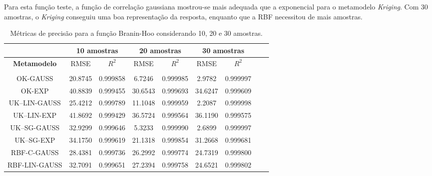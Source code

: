 Para esta função teste, a função de correlação gaussiana mostrou-se mais adequada que a exponencial para o metamodelo {\it Kriging}. Com 30 amostras, o {\it Kriging} conseguiu uma boa representação da resposta, enquanto que a RBF necessitou de mais amostras.

\begin{table}[H]
	\centering
	\caption{Métricas de precisão para a função Branin-Hoo considerando 10, 20 e 30 amostras.} \label{1b} 
	\begin{tabular}{c c c c c c c c c}
		\toprule
		& \multicolumn{2}{c}{\bf 10 amostras} & \multicolumn{2}{c}{\bf 20 amostras} & \multicolumn{2}{c}{\bf 30 amostras} \\ \midrule
		{\bf Metamodelo} & RMSE & {\bf $R^{2}$} & RMSE & {\bf $R^{2}$} & RMSE & {\bf $R^{2}$} \\
		\hline \\
		{OK-GAUSS} & 20.8745 & 0.999858 & 6.7246 & 0.999985 & 2.9782 & 0.999997 \\[4pt]
		OK-EXP & 40.8839 & 0.999455 & 30.6543 & 0.999693 & 34.6247 &	0.999609 \\[4pt]                   
		UK–LIN-GAUSS & 25.4212 & 0.999789 & 11.1048 &	0.999959 & 2.2087 &	0.999998 \\[4pt]
		UK–LIN-EXP & 41.8692 & 0.999429 & 36.5724 & 0.999564 & 36.1190 &	0.999575 \\[4pt]
		UK–SG-GAUSS & 32.9299 & 0.999646 & 5.3233 & 0.999990 & 2.6899 & 0.999997 \\[4pt]
		UK–SG-EXP & 34.1750	& 0.999619 & 21.1318 & 0.999854 & 31.2668	& 0.999681 \\[4pt]
		RBF-C-GAUSS & 28.4381 & 0.999736 & 26.2992 & 0.999774 & 24.7319 &	0.999800 \\[4pt]
		RBF-LIN-GAUSS & 32.7091 & 0.999651 & 27.2394 &	0.999758 & 24.6521 &	0.999802 \\[4pt] \bottomrule
		
	\end{tabular}
	
\end{table}


